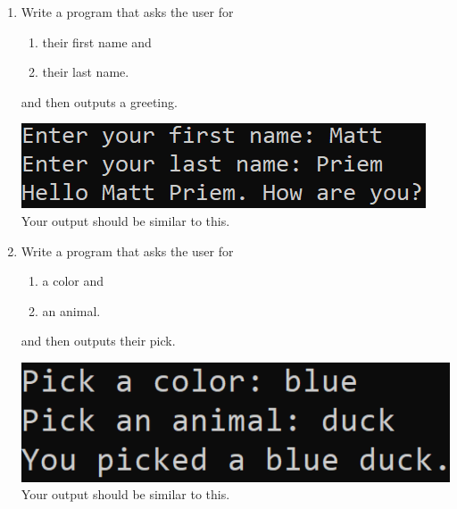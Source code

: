 \documentclass{article}
\begin{document}
\begin{enumerate}

	\item 
		Write a program that asks the user for \\
		\begin{minipage}{0.5\textwidth}
		\vspace*{-0.5em}
			\begin{enumerate}  \setlength\itemsep{-0.3em}
				\item their first name and
				\item their last name.  
			\end{enumerate} \vspace*{-1ex}
		and then outputs a greeting.
		\end{minipage}
		\begin{minipage}{0.5\textwidth}
			\centering
			\includegraphics[scale=0.9]{./imgs/outputGreeting.png}\\
			Your output should be similar to this.
		\end{minipage}




	\item 
		Write a program that asks the user for \\
		\begin{minipage}{0.5\textwidth}
		\vspace*{-0.5em}
			\begin{enumerate}  \setlength\itemsep{-0.3em}
				\item a color and
				\item an animal.  
			\end{enumerate} \vspace*{-1ex}
		and then outputs their pick.
		\end{minipage}
		\begin{minipage}{0.5\textwidth}
			\centering
			\includegraphics[scale=0.75]{./imgs/outputAnimalColor.png}\\
			Your output should be similar to this.
		\end{minipage}




\end{enumerate}
\end{document}
